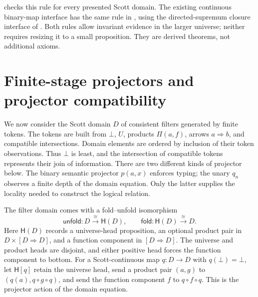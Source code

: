 \documentclass[11pt,a4paper]{article}
\theoremstyle{definition}
\theoremstyle{remark}
\newcommand{\Cont}[2]{[#1\mathbin{\Rightarrow}#2]}
\begin{document}
 checks this rule for every presented Scott
domain. The existing continuous binary-map interface has the same
rule in , using the directed-supremum
closure interface of . Both rules allow
invariant evidence in the larger universe; neither requires resizing
it to a small proposition. They are derived theorems, not additional
axioms.

\section{Finite-stage projectors and projector compatibility}

We now consider the Scott domain $D$ of consistent filters generated by
finite tokens. The tokens are built from $\bot$, $U$, products
$\Pi(a,f)$, arrows $a\Rightarrow b$, and compatible intersections.
Domain elements are ordered by inclusion of their token observations.
Thus $\bot$ is least, and the intersection of compatible tokens
represents their join of information.
There are two different kinds of projector below. The binary semantic
projector $p(a,x)$ enforces typing; the unary $q_n$ observes a finite
depth of the domain equation. Only the latter supplies the locality
needed to construct the logical relation.

The filter domain comes with a fold--unfold isomorphism
\[
 \mathsf{unfold}:D\xrightarrow{\;\cong\;}\mathsf H(D),
 \qquad \mathsf{fold}:\mathsf H(D)\xrightarrow{\;\cong\;}D.
\]
Here $\mathsf H(D)$ records a universe-head proposition, an optional
product pair in $D\times\Cont D D$, and a function component in
$\Cont D D$. The universe and product heads are disjoint, and either
positive head forces the function component to bottom. For a
Scott-continuous map $q:D\to D$ with $q(\bot)=\bot$, let $\mathsf H[q]$
retain the universe head,
send a product pair $(a,g)$ to
$(q(a),q\circ g\circ q)$, and send the function component $f$ to
$q\circ f\circ q$. This is the projector action of the domain equation.
\end{document}

